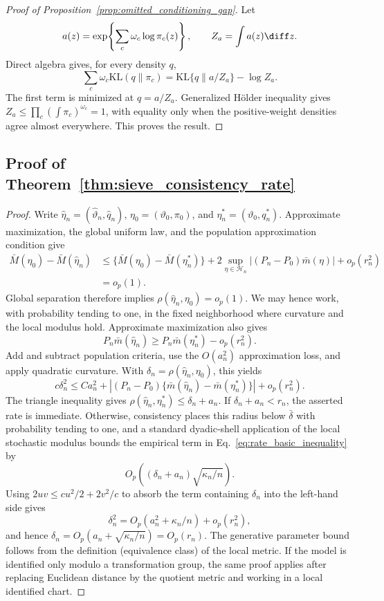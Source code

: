 \begin{proof}[Proof of Proposition~\ref{prop:omitted_conditioning_gap}]
Let
\[
 a(z)=\exp\!\left\{\sum_c\omega_c\log\pi_c(z)\right\},
 \qquad Z_a=\int a(z)\diff z.
\]
Direct algebra gives, for every density $q$,
\[
 \sum_c\omega_c\mathrm{KL}(q\|\pi_c)
 =\mathrm{KL}\{q\|a/Z_a\}-\log Z_a.
\]
The first term is minimized at $q=a/Z_a$.  Generalized H\"older inequality
gives $Z_a\leq\prod_c(\int\pi_c)^{\omega_c}=1$, with equality only when the
positive-weight densities agree almost everywhere.  This proves the result.
\end{proof}

\subsection{Proof of Theorem~\ref{thm:sieve_consistency_rate}}

\begin{proof}
Write $\widehat\eta_n=(\widehat\vartheta_n,\widehat q_n)$,
$\eta_0=(\vartheta_0,\pi_0)$, and
$\eta_n^*=(\vartheta_0,q_n^*)$.  Approximate maximization, the global uniform
law, and the population approximation condition give
\begin{align*}
 \bar M(\eta_0)-\bar M(\widehat\eta_n)
 &\le \{\bar M(\eta_0)-\bar M(\eta_n^*)\}
 +2\sup_{\eta\in\mathcal H_n}|(P_n-P_0)\bar m(\eta)|+o_p(r_n^2)\\
 &=o_p(1).
\end{align*}
Global separation therefore implies
$\rho(\widehat\eta_n,\eta_0)=o_p(1)$.  We may hence work, with probability
tending to one, in the fixed neighborhood where curvature and the local
modulus hold.  Approximate maximization also gives
\[
 P_n\bar m(\widehat\eta_n)
 \ge P_n\bar m(\eta_n^*)-o_p(r_n^2).
\]
Add and subtract population criteria, use the $O(a_n^2)$ approximation loss,
and apply quadratic curvature.  With
$\delta_n=\rho(\widehat\eta_n,\eta_0)$, this yields
\begin{equation}
 c\delta_n^2
 \le C a_n^2
 +|(P_n-P_0)\{\bar m(\widehat\eta_n)-\bar m(\eta_n^*)\}|
 +o_p(r_n^2).
 \label{eq:rate_basic_inequality}
\end{equation}
The triangle inequality gives
$\rho(\widehat\eta_n,\eta_n^*)\le\delta_n+a_n$.  If
$\delta_n+a_n<r_n$, the asserted rate is immediate.  Otherwise, consistency
places this radius below $\bar\delta$ with probability tending to one, and a
standard dyadic-shell application of the local stochastic modulus bounds the
empirical term in Eq.~\eqref{eq:rate_basic_inequality} by
\[
 O_p\!\left((\delta_n+a_n)\sqrt{\kappa_n/n}\right).
\]
Using $2uv\le c u^2/2+2v^2/c$ to absorb the term containing $\delta_n$ into
the left-hand side gives
\[
 \delta_n^2=O_p\left(a_n^2+\kappa_n/n\right)+o_p(r_n^2),
\]
and hence $\delta_n=O_p(a_n+\sqrt{\kappa_n/n})=O_p(r_n)$.  The generative
parameter bound follows from the definition (equivalence class) of the local
metric.  If the model is identified only modulo a transformation group, the
same proof applies after replacing Euclidean distance by the quotient metric
and working in a local identified chart.
\end{proof}

